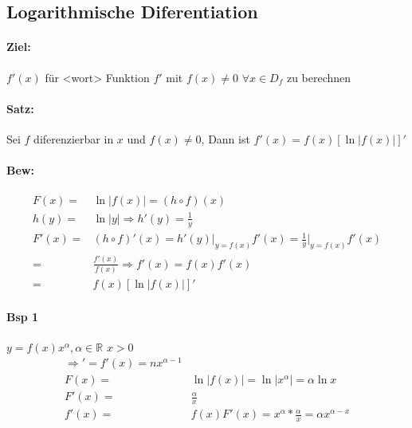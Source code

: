 \documentclass{article}
\begin{document}

\subsection{Logarithmische Diferentiation}
\paragraph{Ziel:} $f'(x)$ für <wort> Funktion $f'$ mit $f(x)\neq 0$ $\forall x \in D_f$ zu berechnen
\paragraph{Satz:} Sei $f$ diferenzierbar in $x$ und $f(x) \neq 0$, Dann ist $f'(x)=f(x)[\ln|f(x)|]'$
\paragraph{Bew:}
\begin{align*}
	F(x)=&\ln|f(x)|=(h\circ f)(x)\\
	h(y)=&\ln|y|\Rightarrow h'(y)=\frac{1}{y}\\
	F'(x)=&(h\circ f)'(x)=h'(y)\bigg \vert _{y=f(x)} f'(x)=\frac{1}{y}\bigg \vert _{y=f(x)} f'(x)\\
	=&\frac{f'(x)}{f(x)}\Rightarrow f'(x)=f(x) f'(x)\\
	=&f(x)[\ln|f(x)|]'
\end{align*}
\paragraph{Bsp 1} $y=f(x)x^\alpha, \alpha \in \mathbb{R}$ $x>0$\\
\begin{align*}
	[n \in \mathbb{N}: y=&x^n  \Rightarrow y'=nx^{x-1]}]
	\Rightarrow'=f'(x)=nx^{\alpha - 1}\\
	F(x)=&\ln|f(x)|=\ln |x^\alpha| = \alpha \ln x\\
	F'(x)=&\frac{\alpha}{x}\\
	f'(x)=&f(x)F'(x)=x^\alpha * \frac{\alpha}{x}=\alpha x^{\alpha - x}
\end{align*}
\end{document}
